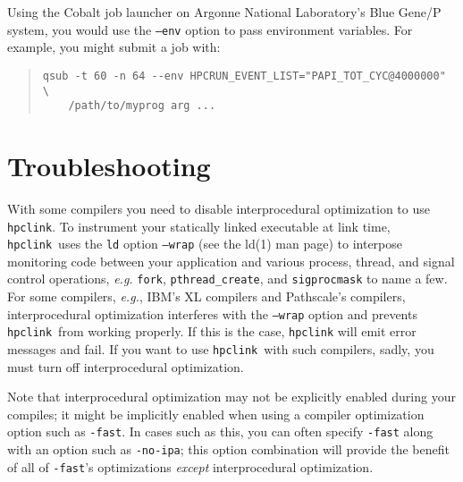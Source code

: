 \documentclass[12pt]{article}
\newcommand{\hpclink}{\texttt{hpclink}}
\begin{document}
Using the Cobalt job launcher on Argonne National Laboratory's Blue Gene/P system, you would use  the {\tt --env} option to pass environment
variables.  For example, you might submit a job with:

\begin{quote}
\begin{verbatim}
qsub -t 60 -n 64 --env HPCRUN_EVENT_LIST="PAPI_TOT_CYC@4000000" \
    /path/to/myprog arg ...
\end{verbatim}
\end{quote}

\section{Troubleshooting}

With some compilers you need to disable interprocedural
optimization to use \hpclink.  To instrument your statically linked executable at link time, \hpclink\ uses the
 {\tt ld} option {\tt --wrap} (see the ld(1) man page) to interpose monitoring code between your application and various process, thread, and signal control operations, {\em e.g.}  {\tt fork},  {\tt pthread\_create}, and {\tt sigprocmask} to name a few. For some compilers, {\em e.g.}, IBM's XL compilers and Pathscale's compilers,
interprocedural optimization interferes with the {\tt --wrap} option
and prevents \hpclink\ from working properly. If this is the case, \hpclink{} will emit error messages and fail. If you want to use \hpclink\ with such compilers, sadly, you must turn off interprocedural optimization. 

Note that interprocedural optimization may not be explicitly enabled during your compiles; it might be implicitly enabled when using a compiler optimization option such as {\tt -fast}. In cases such as this, you can often specify {\tt -fast} along with an option such as {\tt -no-ipa}; this option combination will provide the benefit of all of {\tt -fast}'s optimizations {\em except} interprocedural optimization.
\end{document}
